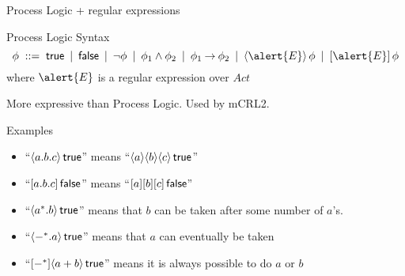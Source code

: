 \documentclass[aspectratio=169]{beamer}
\begin{document}
\begin{slide}{Process Logic + regular expressions}
  
  \begin{block}{Process Logic Syntax}
  \begin{equation*}
  \phi\; ::=\; \true\: \mid\: \false\: \mid\: \neg \phi \: \mid\: \phi_1 \e \phi_2\: \mid\:
             \phi_1 \impp  \phi_2\:   \mid\:
             \pv{\alert{E}}{\phi} \:  \mid\:
             \nc{\alert{E}}{\phi} 
  \end{equation*}
  where $\alert{E}$ is a \alert{regular expression over $Act$}
  \end{block}

  More expressive than Process Logic. Used by mCRL2.

  \begin{exampleblock}{Examples}
  \begin{itemize}
    \item ``$\langle a.b.c \rangle\, \mathsf{true}$'' means ``$\langle a \rangle\langle b \rangle\langle c \rangle\,\mathsf{true}$'' 
    \item ``$[a.b.c]\, \mathsf{false}$'' means ``$[a][b][c]\,\mathsf{false}$'' 
    \item ``$\langle a^{*}.b \rangle\, \mathsf{true}$'' means that $b$ can be taken after some number of $a$'s. 
    \item ``$\langle -^{*}.a \rangle\, \mathsf{true}$'' means that $a$ can \alert{eventually} be taken
    \item ``$[-^{*}]\langle a+b \rangle\, \mathsf{true}$'' means it is \alert{always}  possible to do $a$ or $b$
  \end{itemize}
  \end{exampleblock}

\end{slide}
\end{document}
